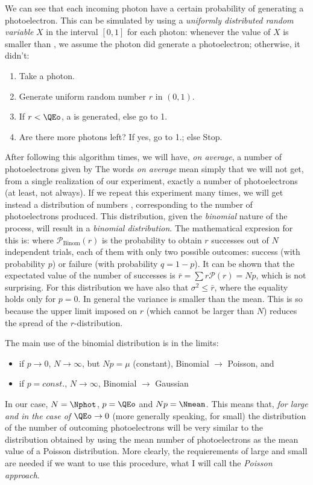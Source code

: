 \noutphotfig

We can see that each incoming photon have a certain probability \QEo
of generating a photoelectron. This can be simulated by using a
\emph{uniformly distributed random variable} $X$ in the interval
$[0,1]$ for each photon: whenever the value of $X$ is smaller than
\QEo, we assume the photon did generate a photoelectron; otherwise, it
didn't:
%
\begin{enumerate}
\item Take a photon.
\item Generate uniform random number $r$ in $(0,1)$.
\item If $r < \QEo$, a \phe is generated, else go to 1.
\item Are there more photons left? If yes, go to 1.; else Stop.
\end{enumerate}
%
After following this algorithm \Nphot times, we will have, \emph{on
  average}, a number of photoelectrons given by
%
\nmeaneq
%
The words \emph{on average} mean simply that we will not get, from a
single realization of our experiment, exactly a number \Nmean of
photoelectrons (at least, not always). If we repeat this experiment
many times, we will get instead a distribution of numbers \Ntrial,
corresponding to the number of photoelectrons produced. This
distribution, given the \emph{binomial} nature of the process, will
result in a \emph{binomial distribution}. The mathematical expresion
for this is:
%
\binomeq
%
where $\mathcal{P}_{\mathrm{Binom}}(r)$ is the probability to obtain
$r$ successes out of $N$ independent trials, each of them with only
two possible outcomes: success (with probability $p$) or failure (with
probability $q=1-p$). It can be shown that the expectated value of the
number of successes is $\bar{r}=\sum r\mathcal{P}(r) = N p$, which is
not surprising. For this distribution we have also that $\sigma^{2}
\leq \bar{r}$, where the equality holds only for $p=0$. In general the
variance is smaller than the mean. This is so because the upper limit
imposed on $r$ (which cannot be larger than $N$) reduces the spread of
the $r$-distribution.

\varquotfig

\noutqesmallfig

The main use of the binomial distribution is in the limits:
%
\begin{itemize}
\item if $p\rightarrow 0$, $N\rightarrow\infty$, but $Np=\mu$ (constant),
  Binomial $\longrightarrow$ Poisson, and
\item if $p=const.$, $N\rightarrow\infty$, Binomial $\longrightarrow$
  Gaussian
\end{itemize}
%
In our case, $N=\Nphot$, $p=\QEo$ and $Np=\Nmean$.  This means that,
\emph{for \Nphot large and in the case of $\QEo\rightarrow 0$} (more
generally speaking, for \QEo small) the distribution of the number of
outcoming photoelectrons \Ntrial will be very similar to the
distribution obtained by using the mean number of photoelectrons
\Nmean as the mean value of a Poisson distribution. More clearly, the
requierements of \Nphot large and \QEo small are needed if we want to
use this procedure, what I will call the \emph{Poisson approach}.

